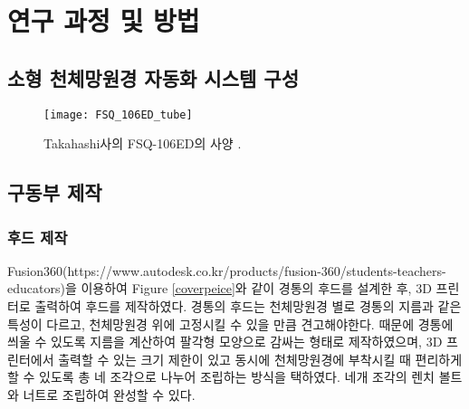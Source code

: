 
\section{연구 과정 및 방법}


\subsection{소형 천체망원경 자동화 시스템 구성}




\begin{figure}[h]
	\begin{center}
		\texttt{[image: FSQ\_106ED\_tube]}
	\end{center}
	\caption{Takahashi사의 FSQ-106ED의 사양 \cite{fsq106ed}.}
	\label{FSQ}
\end{figure}


\subsection{구동부 제작}

\subsubsection{후드 제작}
Fusion360(https://www.autodesk.co.kr/products/fusion-360/students-teachers-educators)을 이용하여 \textrm{Figure} \ref{coverpeice}와 같이 경통의 후드를 설계한 후, 3D 프린터로 출력하여 후드를 제작하였다. 경통의 후드는 천체망원경 별로 경통의 지름과 같은 특성이 다르고, 천체망원경 위에 고정시킬 수 있을 만큼 견고해야한다. 때문에 경통에 씌울 수 있도록 지름을 계산하여 팔각형 모양으로 감싸는 형태로 제작하였으며, 3D 프린터에서 출력할 수 있는 크기 제한이 있고 동시에 천체망원경에 부착시킬 때 편리하게 할 수 있도록 총 네 조각으로 나누어 조립하는 방식을 택하였다. 네개 조각의 렌치 볼트와 너트로 조립하여 완성할 수 있다.

